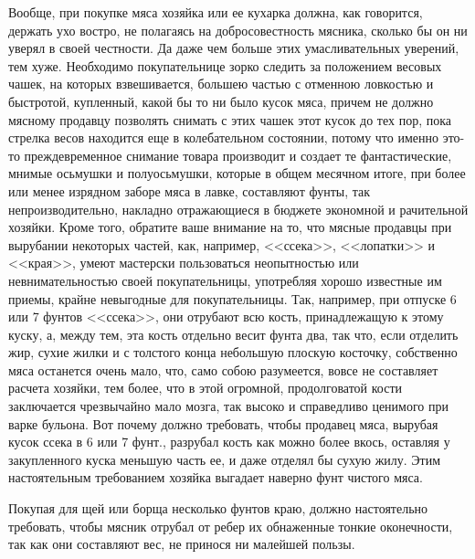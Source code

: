 Вообще, при покупке мяса хозяйка или ее кухарка должна, как говорится, держать ухо востро, не полагаясь на добросовестность мясника, сколько бы он ни уверял в своей честности. Да даже чем больше этих умасливательных уверений, тем хуже. Необходимо покупательнице зорко следить за положением весовых чашек, на которых взвешивается, большею частью с отменною ловкостью и быстротой, купленный, какой бы то ни было кусок мяса, причем не должно мясному продавцу позволять снимать с этих чашек этот кусок до тех пор, пока стрелка весов находится еще в колебательном состоянии, потому что именно это-то преждевременное снимание товара производит и создает те фантастические, мнимые осьмушки и полуосьмушки, которые в общем месячном итоге, при более или менее изрядном заборе мяса в лавке, составляют фунты, так непроизводительно, накладно отражающиеся в бюджете экономной и рачительной хозяйки. Кроме того, обратите ваше внимание на то, что мясные продавцы при вырубании некоторых частей, как, например, <<ссека>>, <<лопатки>> и <<края>>, умеют мастерски пользоваться неопытностью или невнимательностью своей покупательницы, употребляя хорошо известные им приемы, крайне невыгодные для покупательницы. Так, например, при отпуске 6 или 7 фунтов <<ссека>>, они отрубают всю кость, принадлежащую к этому куску, а, между тем, эта кость отдельно весит фунта два, так что, если отделить жир, сухие жилки и с толстого конца небольшую плоскую косточку, собственно мяса останется очень мало, что, само собою разумеется, вовсе не составляет расчета хозяйки, тем более, что в этой огромной, продолговатой кости заключается чрезвычайно мало мозга, так высоко и справедливо ценимого при варке бульона. Вот почему должно требовать, чтобы продавец мяса, вырубая кусок ссека в 6 или 7 фунт., разрубал кость как можно более вкось, оставляя у закупленного куска меньшую часть ее, и даже отделял бы сухую жилу. Этим настоятельным требованием хозяйка выгадает наверно фунт чистого мяса.

Покупая для щей или борща несколько фунтов краю, должно настоятельно требовать, чтобы мясник отрубал от ребер их обнаженные тонкие оконечности, так как они составляют вес, не принося ни малейшей пользы.

